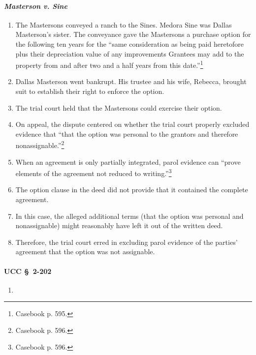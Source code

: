 \paragraph{\emph{Masterson v. Sine}}

\begin{enumerate}
    \item The Mastersons conveyed a ranch to the Sines. Medora Sine was Dallas 
    Masterson's sister. The conveyance gave the Mastersons a purchase option 
    for the following ten years for the ``same consideration as being paid 
    heretofore plus their depreciation value of any improvements Grantees may 
    add to the property from and after two and a half years from this 
    date.''\footnote{Casebook p. 595.}
    \item Dallas Masterson went bankrupt. His trustee and his wife, Rebecca, 
    brought suit to establish their right to enforce the option.
    \item The trial court held that the Mastersons could exercise their 
    option.
    \item On appeal, the dispute centered on whether the trial court properly 
    excluded evidence that ``that the option was personal to the grantors and 
    therefore nonassignable.''\footnote{Casebook p. 596.}
    \item When an agreement is only partially integrated, parol evidence can 
    ``prove elements of the agreement not reduced to 
    writing.''\footnote{Casebook p. 596.}
    \item The option clause in the deed did not provide that it contained the 
    complete agreement.
    \item In this case, the alleged additional terms (that the option was 
    personal and nonassignable) might reasonably have left it out of the 
    written deed.
    \item Therefore, the trial court erred in excluding parol evidence of the 
    parties' agreement that the option was not assignable.
\end{enumerate}

\paragraph{UCC \S\ 2-202}

\begin{enumerate}
    \item %
\end{enumerate}

